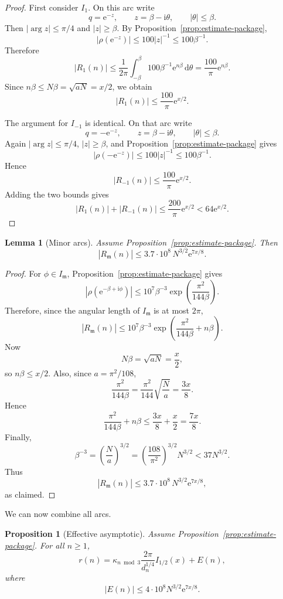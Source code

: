 \documentclass[10pt,a4paper]{amsart}
\newtheorem{proposition}[theorem]{Proposition}
\newtheorem{lemma}[theorem]{Lemma}
\newcommand{\ii}{\mathrm i}
\newcommand{\e}{\mathrm e}
\newcommand{\dd}{\mathrm d}
\newcommand{\mm}{\mathfrak m}
\begin{document}
\begin{proof}
First consider $I_1$.  On this arc write
\[
q=\e^{-z},
\qquad
z=\beta-\ii\theta,
\qquad
|\theta|\leq\beta.
\]
Then $|\arg z|\leq\pi/4$ and $|z|\geq\beta$.  By
Proposition~\ref{prop:estimate-package},
\[
|\rho(\e^{-z})|\leq100|z|^{-1}\leq100\beta^{-1}.
\]
Therefore
\[
|R_1(n)|
\leq
\frac1{2\pi}
\int_{-\beta}^{\beta}
100\beta^{-1}\e^{n\beta}\,\dd\theta
=
\frac{100}{\pi}\e^{n\beta}.
\]
Since $n\beta\leq N\beta=\sqrt{aN}=x/2$, we obtain
\[
|R_1(n)|\leq\frac{100}{\pi}\e^{x/2}.
\]

The argument for $I_{-1}$ is identical.  On that arc write
\[
q=-\e^{-z},
\qquad
z=\beta-\ii\theta,
\qquad
|\theta|\leq\beta.
\]
Again $|\arg z|\leq\pi/4$, $|z|\geq\beta$, and
Proposition~\ref{prop:estimate-package} gives
\[
|\rho(-\e^{-z})|\leq100|z|^{-1}\leq100\beta^{-1}.
\]
Hence
\[
|R_{-1}(n)|\leq\frac{100}{\pi}\e^{x/2}.
\]
Adding the two bounds gives
\[
|R_1(n)|+|R_{-1}(n)|
\leq
\frac{200}{\pi}\e^{x/2}
<64\e^{x/2}.
\]
\end{proof}

\begin{lemma}[Minor arcs]\label{lem:minor-arcs}
Assume Proposition~\ref{prop:estimate-package}.  Then
\begin{equation}\label{eq:minor-bound}
|R_{\mm}(n)|
\leq
3.7\cdot10^8\,N^{3/2}\e^{7x/8}.
\end{equation}
\end{lemma}

\begin{proof}
For $\phi\in I_{\mm}$, Proposition~\ref{prop:estimate-package} gives
\[
|\rho(\e^{-\beta+\ii\phi})|
\leq
10^7\beta^{-3}
\exp\left(\frac{\pi^2}{144\beta}\right).
\]
Therefore, since the angular length of $I_{\mm}$ is at most $2\pi$,
\[
|R_{\mm}(n)|
\leq
10^7\beta^{-3}
\exp\left(\frac{\pi^2}{144\beta}+n\beta\right).
\]
Now
\[
N\beta=\sqrt{aN}=\frac{x}{2},
\]
so $n\beta\leq x/2$.  Also, since $a=\pi^2/108$,
\[
\frac{\pi^2}{144\beta}
=
\frac{\pi^2}{144}\sqrt{\frac{N}{a}}
=
\frac{3x}{8}.
\]
Hence
\[
\frac{\pi^2}{144\beta}+n\beta
\leq
\frac{3x}{8}+\frac{x}{2}
=
\frac{7x}{8}.
\]
Finally,
\[
\beta^{-3}
=
\left(\frac{N}{a}\right)^{3/2}
=
\left(\frac{108}{\pi^2}\right)^{3/2}N^{3/2}
<37N^{3/2}.
\]
Thus
\[
|R_{\mm}(n)|
\leq
3.7\cdot10^8\,N^{3/2}\e^{7x/8},
\]
as claimed.
\end{proof}

We can now combine all arcs.

\begin{proposition}[Effective asymptotic]\label{prop:effective-asymp}
Assume Proposition~\ref{prop:estimate-package}.  For all $n\geq1$,
\begin{equation}\label{eq:effective-asymp}
r(n)
=
\kappa_{n\bmod3}\frac{2\pi}{d_n^{1/4}}I_{1/2}(x)
+
E(n),
\end{equation}
where
\begin{equation}\label{eq:global-error}
|E(n)|\leq4\cdot10^8N^{3/2}\e^{7x/8}.
\end{equation}
\end{proposition}
\end{document}
